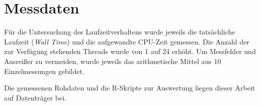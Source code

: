 \documentclass[11pt]{scrartcl}
\begin{document}
\section{Messdaten}

Für die Untersuchung des Laufzeitverhaltens wurde jeweils die tatsächliche Laufzeit (\emph{Wall Time}) und die
aufgewandte CPU-Zeit gemessen. Die Anzahl der zur Verfügung stehenden Threads wurde von 1 auf 24 erhöht. Um Messfehler
und Ausreißer zu vermeiden, wurde jeweils das arithmetische Mittel aus 10 Einzelmessungen gebildet.

Die gemessenen Rohdaten und die R-Skripte zur Auswertung liegen dieser Arbeit auf Datenträger bei.

	
\end{document}
